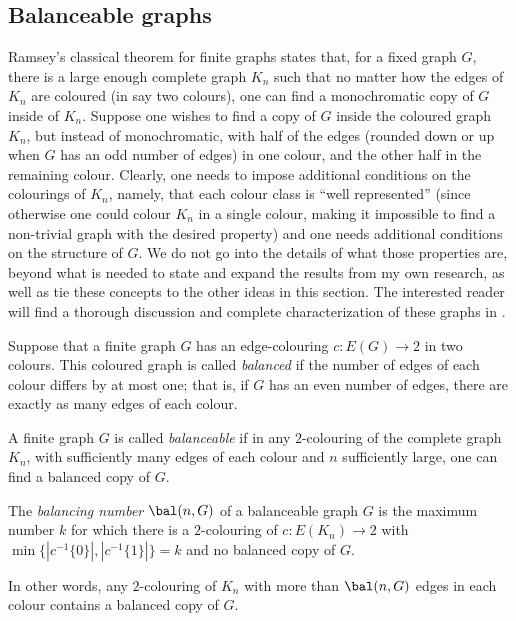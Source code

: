 
\subsection{Balanceable graphs}\label{subsec:amoebas_bal}

Ramsey's classical theorem for finite graphs states that, for a fixed graph $G$, there is a large enough complete graph $K_n$ such that no matter how the edges of $K_n$ are coloured (in say two colours), one can find a monochromatic copy of $G$ inside of $K_n$.
Suppose one wishes to find a copy of $G$ inside the coloured graph $K_n$, but instead of monochromatic, with half of the edges (rounded down or up when $G$ has an odd number of edges) in one colour, and the other half in the remaining colour.
Clearly, one needs to impose additional conditions on the colourings of $K_n$, namely, that each colour class is ``well represented'' (since otherwise one could colour $K_n$ in a single colour, making it impossible to find a non-trivial graph with the desired property) and one needs additional conditions on the structure of $G$.
We do not go into the details of what those properties are, beyond what is needed to state and expand the results from my own research, as well as tie these concepts to the other ideas in this section.
The interested reader will find a thorough discussion and complete characterization of these graphs in \cite[Section~2]{unavoidable_chromatic}.

\begin{definition}\label{def:balancing_num}
    Suppose that a finite graph $G$ has an edge-colouring $c\colon E(G)\to2$ in two colours.
    This coloured graph is called \emph{balanced} if the number of edges of each colour differs by at most one; that is, if $G$ has an even number of edges, there are exactly as many edges of each colour.

    A finite graph $G$ is called \emph{balanceable} if in any $2$-colouring of the complete graph $K_n$, with sufficiently many edges of each colour and $n$ sufficiently large, one can find a balanced copy of $G$.

    The \emph{balancing number} $\bal(n,G)$ of a balanceable graph $G$ is the maximum number $k$ for which there is a $2$-colouring of $c\colon E(K_n)\to2$ with $\min\{|c^{-1}\{0\}|,|c^{-1}\{1\}|\}=k$ and no balanced copy of $G$.
\end{definition}

In other words, any $2$-colouring of $K_n$ with more than $\bal(n,G)$ edges in each colour contains a balanced copy of $G$.

